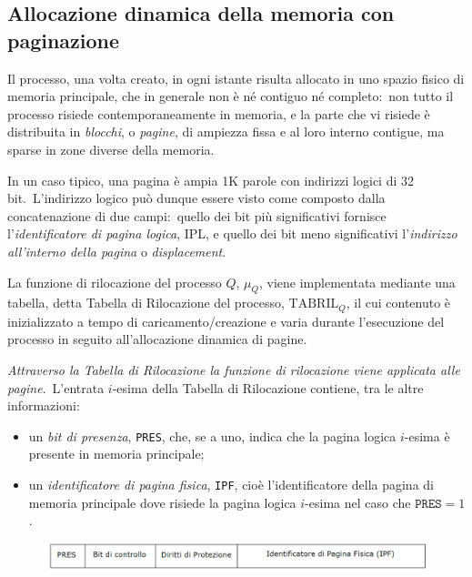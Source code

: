 \subsection{Allocazione dinamica della memoria con paginazione}

Il processo, una volta creato, in ogni istante risulta allocato in uno spazio fisico di memoria principale, che in generale non è né contiguo né completo:\ non tutto il processo risiede contemporaneamente in memoria, e la parte che vi risiede è distribuita in \textit{blocchi}, o \textit{pagine}, di ampiezza fissa e al loro interno contigue, ma sparse in zone diverse della memoria.

In un caso tipico, una pagina è ampia 1K parole con indirizzi logici di 32 bit.\
L'indirizzo logico può dunque essere visto come composto dalla concatenazione di due campi:\ quello dei bit più significativi fornisce l'\textit{identificatore di pagina logica}, IPL, e quello dei bit meno significativi l'\textit{indirizzo all'interno della pagina} o \textit{displacement}.

La funzione di rilocazione del processo $Q$, $\mu_Q$, viene implementata mediante una tabella, detta Tabella di Rilocazione del processo, $\mathrm{TABRIL}_Q$, il cui contenuto è inizializzato a tempo di caricamento/creazione e varia durante l'esecuzione del processo in seguito all'allocazione dinamica di pagine.

\textit{Attraverso la Tabella di Rilocazione la funzione di rilocazione viene applicata alle pagine}.\
L'entrata $i$-esima della Tabella di Rilocazione contiene, tra le altre informazioni:

\begin{itemize}
    \item un \textit{bit di presenza}, \texttt{PRES}, che, se a uno, indica che la pagina logica $i$-esima è presente in memoria principale;
    \item un \textit{identificatore di pagina fisica}, \texttt{IPF}, cioè l'identificatore della pagina di memoria principale dove risiede la pagina logica $i$-esima nel caso che $\mathtt{PRES} = 1$.
\end{itemize}

\begin{figure}[H]
    \centering
    \includegraphics[width=\textwidth]{immagini/Tabril.png}
\end{figure}

